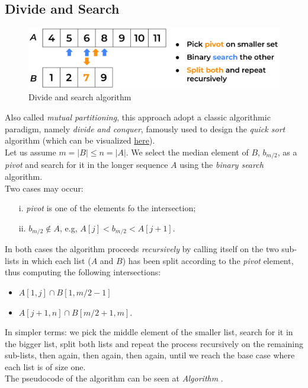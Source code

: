 \subsection{Divide and Search}

\begin{figure}[H] 
    \begin{center}
        \includegraphics[width=.8\textwidth]{imgs/divide_and_search.png}
        \caption{Divide and search algorithm \label{fig:divandsearch}}
    \end{center}
\end{figure}

Also called \textit{mutual partitioning}, this approach adopt a classic algorithmic paradigm, namely \textit{divide and conquer}, famously used to design the \textit{quick sort} algorithm (which can be visualized \href{https://en.wikipedia.org/wiki/Quicksort}{here}).\\
Let us assume $m=|B| \leq n=|A|$. We select the median element of $B$, $b_{m/2}$, as a \textit{pivot} and search for it in the longer sequence $A$ using the \textit{binary search}  algorithm.\\
Two cases may occur: 

\begin{itemize}
    \item[i.] \textit{pivot} is one of the elements fo the intersection;
    \item[ii.] $b_{m/2} \notin A$, e.g, $A[j]<b_{m/2}<A[j+1]$.
\end{itemize}

In both cases the algorithm proceeds \textit{recursively} by calling itself on the two sub-lists in which each list ($A$ and $B$) has been split according to the \textit{pivot} element, thus computing the following intersections:

\begin{itemize}
    \item $A[1, j] \cap B[1, m/2-1]$
    \item $A[ j+1, n] \cap B[m/2+1, m]$.
\end{itemize}

In simpler terms: we pick the middle element of the smaller list, search for it in the bigger list, split both lists and repeat the process recursively on the remaining sub-lists, then again, then again, then again, until we reach the base case where each list is of size one.\\
The pseudocode of the algorithm can be seen at \textit{Algorithm} .\\

